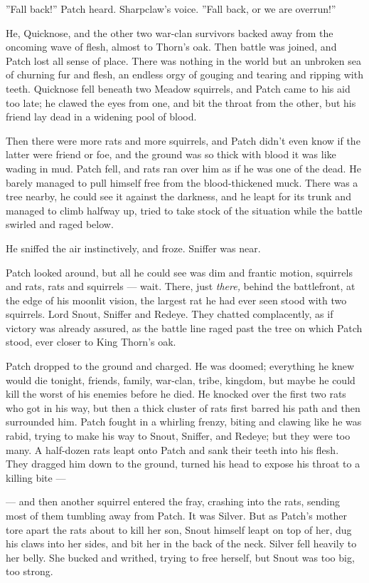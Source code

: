 \documentclass[12pt]{book}
\begin{document}
''Fall back!'' Patch heard. Sharpclaw's voice. ''Fall back, or we are
overrun!''

He, Quicknose, and the other two war-clan survivors backed away from
the oncoming wave of flesh, almost to Thorn's oak. Then battle was
joined, and Patch lost all sense of place. There was nothing in the
world but an unbroken sea of churning fur and flesh, an endless orgy
of gouging and tearing and ripping with teeth. Quicknose fell beneath
two Meadow squirrels, and Patch came to his aid too late; he clawed
the eyes from one, and bit the throat from the other, but his friend
lay dead in a widening pool of blood.

Then there were more rats and more squirrels, and Patch didn't even
know if the latter were friend or foe, and the ground was so thick
with blood it was like wading in mud. Patch fell, and rats ran over
him as if he was one of the dead. He barely managed to pull himself
free from the blood-thickened muck. There was a tree nearby, he could
see it against the darkness, and he leapt for its trunk and managed to
climb halfway up, tried to take stock of the situation while the
battle swirled and raged below.

He sniffed the air instinctively, and froze. Sniffer was near.

Patch looked around, but all he could see was dim and frantic motion,
squirrels and rats, rats and squirrels --- wait. There, just
\textit{there,} behind the battlefront, at the edge of his moonlit
vision, the largest rat he had ever seen stood with two
squirrels. Lord Snout, Sniffer and Redeye. They chatted complacently,
as if victory was already assured, as the battle line raged past the
tree on which Patch stood, ever closer to King Thorn's oak.

Patch dropped to the ground and charged. He was doomed; everything he
knew would die tonight, friends, family, war-clan, tribe, kingdom, but
maybe he could kill the worst of his enemies before he died. He
knocked over the first two rats who got in his way, but then a thick
cluster of rats first barred his path and then surrounded him. Patch
fought in a whirling frenzy, biting and clawing like he was rabid,
trying to make his way to Snout, Sniffer, and Redeye; but they were
too many. A half-dozen rats leapt onto Patch and sank their teeth into
his flesh. They dragged him down to the ground, turned his head to
expose his throat to a killing bite ---

--- and then another squirrel entered the fray, crashing into the
rats, sending most of them tumbling away from Patch. It was
Silver. But as Patch's mother tore apart the rats about to kill her
son, Snout himself leapt on top of her, dug his claws into her sides,
and bit her in the back of the neck. Silver fell heavily to her
belly. She bucked and writhed, trying to free herself, but Snout was
too big, too strong.
\end{document}

